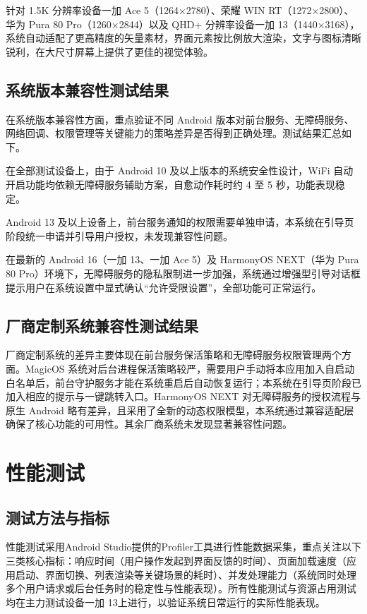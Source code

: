 针对 1.5K 分辨率设备一加 Ace 5（1264×2780）、荣耀 WIN RT（1272×2800）、华为 Pura 80 Pro（1260×2844）以及 QHD+ 分辨率设备一加 13（1440×3168），系统自动适配了更高精度的矢量素材，界面元素按比例放大渲染，文字与图标清晰锐利，在大尺寸屏幕上提供了更佳的视觉体验。

\subsection{系统版本兼容性测试结果}
在系统版本兼容性方面，重点验证不同 Android 版本对前台服务、无障碍服务、网络回调、权限管理等关键能力的策略差异是否得到正确处理。测试结果汇总如下。

在全部测试设备上，由于 Android 10 及以上版本的系统安全性设计，WiFi 自动开启功能均依赖无障碍服务辅助方案，自愈动作耗时约 4 至 5 秒，功能表现稳定。

Android 13 及以上设备上，前台服务通知的权限需要单独申请，本系统在引导页阶段统一申请并引导用户授权，未发现兼容性问题。

在最新的 Android 16（一加 13、一加 Ace 5）及 HarmonyOS NEXT（华为 Pura 80 Pro）环境下，无障碍服务的隐私限制进一步加强，系统通过增强型引导对话框提示用户在系统设置中显式确认“允许受限设置”，全部功能可正常运行。

\subsection{厂商定制系统兼容性测试结果}
厂商定制系统的差异主要体现在前台服务保活策略和无障碍服务权限管理两个方面。MagicOS 系统对后台进程保活策略较严，需要用户手动将本应用加入自启动白名单后，前台守护服务才能在系统重启后自动恢复运行；本系统在引导页阶段已加入相应的提示与一键跳转入口。HarmonyOS NEXT 对无障碍服务的授权流程与原生 Android 略有差异，且采用了全新的动态权限模型，本系统通过兼容适配层确保了核心功能的可用性。其余厂商系统未发现显著兼容性问题。

\section{性能测试}
\subsection{测试方法与指标}
性能测试采用Android Studio提供的Profiler工具进行性能数据采集，重点关注以下三类核心指标：响应时间（用户操作发起到界面反馈的时间）、页面加载速度（应用启动、界面切换、列表渲染等关键场景的耗时）、并发处理能力（系统同时处理多个用户请求或后台任务时的稳定性与性能表现）。所有性能测试与资源占用测试均在主力测试设备一加 13上进行，以验证系统日常运行的实际性能表现。

